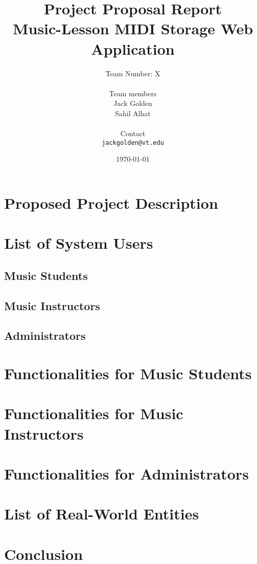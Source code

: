 \documentclass{article}
\title{\vspace{2in} Project Proposal Report \\ \vspace{0.2in} Music-Lesson MIDI Storage Web Application}
\author{Team Number: X \\ \vspace{0.1in} \\ Team members \\ Jack Golden \\ Sahil Alhat \\ \vspace{0.1in}\\ Contact \\ \texttt{jackgolden@vt.edu}}
\date{\vspace{2in} \today}
\begin{document}
\maketitle
\thispagestyle{empty}

\newpage

\section{Proposed Project Description}

\section{List of System Users}
\subsection{Music Students}
\subsection{Music Instructors}
\subsection{Administrators}

\section{Functionalities for Music Students}

\section{Functionalities for Music Instructors}

\section{Functionalities for Administrators}

\section{List of Real-World Entities}

\section{Conclusion}
\end{document}
